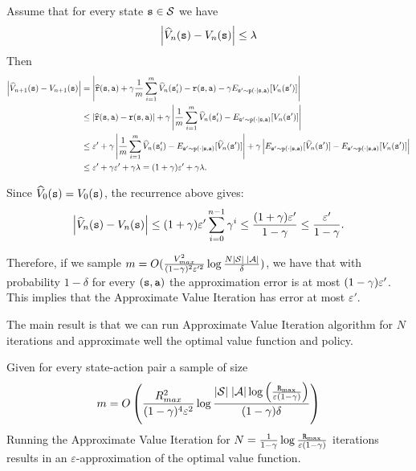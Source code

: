 Assume that for every state ${\tt s} \in \mathcal{S}$  we have
\[
\left|\widehat{V}_n({\tt s}) - V_n({\tt s})\right|\leq \lambda
\]
Then
\begin{align*}
\left|\widehat{V}_{n+1}(\state)-V_{n+1}(\state)\right|& =
\left|\widehat{\reward}(\state,\action)+\discount
\frac{1}{m}\sum_{i=1}^m \widehat{V}_n(\state'_i) -
\reward(\state,\action)-\discount E_{\state'\sim \transitionprob(\cdot
|\state,\action)} [V_n(\state')] \right|\\
&\leq |\widehat{\reward}(\state,\action)- \reward(\state,\action)|
+\discount \left| \frac{1}{m}\sum_{i=1}^m \widehat{V}_n(\state'_i) -
E_{\state'\sim \transitionprob(\cdot
|\state,\action)} [V_n(\state')] \right|\\
%
&\leq \varepsilon' + \discount \left| \frac{1}{m}\sum_{i=1}^m \widehat{V}_n(\state'_i) -
E_{\state'\sim \transitionprob(\cdot
|\state,\action)} [\widehat{V}_n(\state')] \right| + \discount \left| E_{\state'\sim \transitionprob(\cdot
|\state,\action)} [\widehat{V}_n(\state')] -
E_{\state'\sim \transitionprob(\cdot
|\state,\action)} [V_n(\state')] \right|\\
 &\leq \varepsilon'+\discount\varepsilon' +\discount\lambda = (1+\discount)\varepsilon' +\discount\lambda.
\end{align*}

Since $\widehat{V}_0({\tt s}) = V_0({\tt s})$, the recurrence above gives:
\[
\left|\widehat{V}_n({\tt s}) - V_n({\tt s})\right|\leq (1+\gamma)\varepsilon'\sum_{i=0}^{n-1}\gamma^i \leq \frac{(1+\gamma)\varepsilon'}{1-\gamma} \leq \frac{\varepsilon'}{1-\gamma}.
\]

Therefore, if we sample $m=O(\frac{V^2_{max}}{(1-\gamma)^2\varepsilon'^2}\log \frac{N
|\mathcal{S}| \;|\mathcal{A}|}{\delta})$, we have that with probability
$1-\delta$ for every $({\tt s},{\tt a})$ the approximation error is
at most $(1-\gamma)\varepsilon'$. This implies that the Approximate Value
Iteration has error at most $\varepsilon'$.



The main result is that we can run Approximate Value Iteration
algorithm for $N$ iterations and approximate well the optimal value
function and policy.

\begin{theorem}
Given for every state-action pair a sample of size
\[
m=O\left(\frac{R^2_{max}}{(1-\gamma)^4\varepsilon^2}\log \frac{ |\mathcal{S}| \;|\mathcal{A}|\log \left(
\frac{{\tt R}_{\max }}{\varepsilon(1-\gamma)} \right) }{(1-\gamma)\delta}\right)
\]
Running the Approximate Value Iteration for
$N=\frac{1}{1-\gamma}\log \frac{{\tt R}_{\max }}{\varepsilon(1-\gamma)}$
iterations results in an $\varepsilon$-approximation of the optimal value
function.
\end{theorem}

